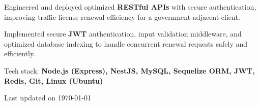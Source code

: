 \documentclass[]{deedy-resume-reversed}
\begin{document}
\vspace{2pt}
\begin{tightemize}
\item Engineered and deployed optimized \textbf{RESTful APIs} with secure authentication, improving traffic license renewal efficiency for a government-adjacent client.
\item Implemented secure \textbf{JWT} authentication, input validation middleware, and optimized database indexing to handle concurrent renewal requests safely and efficiently.
\item Tech stack: \textbf{Node.js (Express), NestJS, MySQL, Sequelize ORM, JWT, Redis, Git, Linux (Ubuntu)}
\end{tightemize}

\vspace{8pt}
\hrulefill
\begin{center}
    \footnotesize \color{gray}
    Last updated on \today
\end{center}
\end{document}
